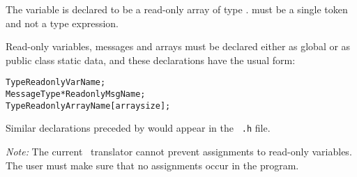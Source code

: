 The variable  is declared to be a read-only array of type
.  must be a single token and not a type expression.

Read-only variables, messages and arrays must be declared either as
global or as public class static data, and these declarations have the
usual form:

\begin{alltt}
 Type ReadonlyVarName;
 MessageType *ReadonlyMsgName;
 Type ReadonlyArrayName [arraysize];
\end{alltt}

Similar declarations preceded by  would appear in the {\tt
.h} file. 

{\it Note:}  The current \charmpp\ translator cannot prevent
assignments to read-only variables.  The user must make sure that no
assignments occur in the program.

